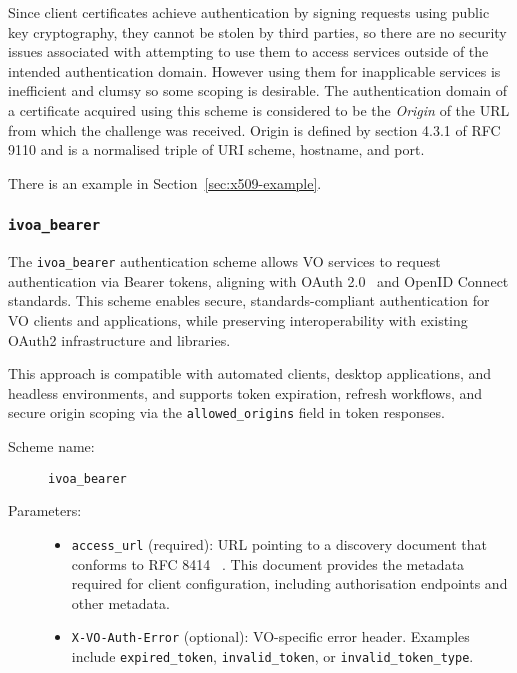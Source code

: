 \documentclass[11pt,a4paper]{ivoa}
\newcommand{\rfc}[1]{RFC\,#1}
\begin{document}
Since client certificates achieve authentication by signing requests
using public key cryptography, they cannot be stolen by third parties,
so there are no security issues associated with attempting to use them
to access services outside of the intended authentication domain.
However using them for inapplicable services is inefficient and clumsy
so some scoping is desirable.
The authentication domain of a certificate acquired using this scheme is
considered to be the {\em Origin\/} of the URL from which
the challenge was received.
Origin is defined by section 4.3.1 of \rfc{9110}
and is a normalised triple of URI scheme, hostname, and port.


There is an example in Section~\ref{sec:x509-example}.

\subsubsection{\mbox{\tt ivoa\_bearer}}\label{sec:ivoa-bearer}
The \verb|ivoa_bearer| authentication scheme allows VO services to request authentication via Bearer tokens,
aligning with OAuth 2.0~\citep{rfc6749} and OpenID Connect standards. This scheme enables secure,
standards-compliant authentication for VO clients and applications, while preserving interoperability with
existing OAuth2 infrastructure and libraries.

This approach is compatible with automated clients, desktop applications, and headless environments, and
supports token expiration, refresh workflows, and secure origin scoping via the \texttt{allowed\_origins}
field in token responses.

\begin{description}
  \item[Scheme name:] \verb|ivoa_bearer|
  \item[Parameters:] \mbox{}
  \begin{itemize}
  \item \texttt{access\_url} (required): URL pointing to a discovery document that conforms to RFC 8414~\citep{rfc8414} . This document provides the metadata required for client configuration, including authorisation endpoints and other metadata.
  \item \texttt{X-VO-Auth-Error} (optional): VO-specific error header. Examples include \texttt{expired\_token}, \texttt{invalid\_token}, or \texttt{invalid\_token\_type}.
  \end{itemize}
\end{description}
\end{document}
